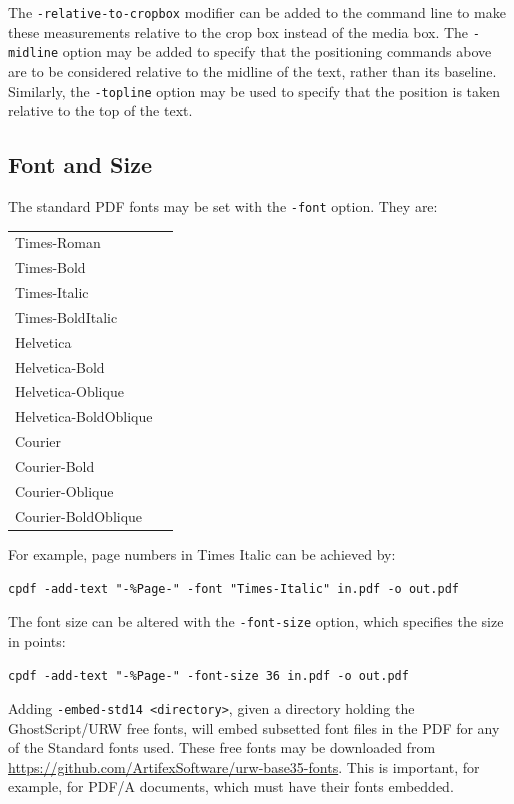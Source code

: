 \documentclass{book}
\begin{document}
The \texttt{-relative-to-cropbox} modifier can be added to the command line to
make these measurements relative to the crop box instead of the media box. The \texttt{-midline} option may be added to specify that the positioning
commands above are to be considered relative to the midline of the text, rather
than its baseline. Similarly, the \texttt{-topline} option may be used to specify that the position is taken relative to the top of the text.

  \subsection{Font and Size}
\label{fonts}
  The standard PDF fonts may be set with the \texttt{-font} option. They are:

  \vspace{2mm}
  \begin{tabular}{ll}
    Times-Roman&\\
    Times-Bold&\\
    Times-Italic&\\
    Times-BoldItalic&\\
    Helvetica&\\
    Helvetica-Bold&\\
    Helvetica-Oblique&\\
    Helvetica-BoldOblique&\\
    Courier&\\
    Courier-Bold&\\
    Courier-Oblique&\\
Courier-BoldOblique
  \end{tabular}
 \vspace{2mm}

  \noindent For example, page numbers in Times Italic can be achieved by:

  \begin{framed}
    \noindent\small\verb!cpdf -add-text "-%Page-" -font "Times-Italic" in.pdf -o out.pdf!
  \end{framed}

\noindent The font size can be altered with the \texttt{-font-size} option, which
specifies the size in points:

  \begin{framed}
    \noindent\small\verb!cpdf -add-text "-%Page-" -font-size 36 in.pdf -o out.pdf!
  \end{framed}

  \noindent Adding \texttt{-embed-std14 <directory>}, given a directory holding the GhostScript/URW free fonts, will embed subsetted font files in the PDF for any of the Standard fonts used. These free fonts may be downloaded from \url{https://github.com/ArtifexSoftware/urw-base35-fonts}. This is important, for example, for PDF/A documents, which must have their fonts embedded.
\end{document}
